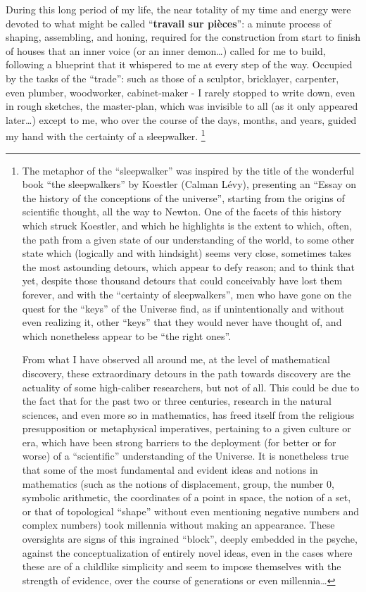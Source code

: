 During this long period of my life,
the near totality of my time and energy were devoted to what might be called 
``\textbf{travail sur pi\`eces}'': a minute process of  
shaping, assembling, and honing, required for the construction from start to finish of 
houses that an inner voice (or an inner demon\ldots) called for me to build, following a
blueprint that it whispered to me at every step of the way. Occupied by the tasks of the
``trade'': such as those of a sculptor, bricklayer, carpenter, even plumber, woodworker, 
cabinet-maker - I rarely stopped to write down, even in rough sketches, the master-plan,
which was invisible to all (as it only appeared later\ldots) except to me, who over the
course of the days, months, and years, guided my hand with the certainty of a sleepwalker.
\footnote{The metaphor of the ``sleepwalker'' was inspired by the title of the wonderful
book ``the sleepwalkers'' by Koestler (Calman L\'evy), presenting an ``Essay on the
history of the conceptions of the universe'', starting from the origins of scientific
thought, all the way to Newton. One of the facets of this history which struck Koestler,
and which he highlights is the extent to which, often, the path from a given 
state of our understanding of the world, to some other state which (logically and with
hindsight) seems very close, sometimes takes the most astounding detours, which appear to
defy reason; and to think that yet, despite those thousand detours that could conceivably
have lost them forever, and with the ``certainty of sleepwalkers'', men who have gone on
the quest for the ``keys'' of the Universe find, as if unintentionally and without even
realizing it, other ``keys'' that they would never have thought of, and which nonetheless
appear to be ``the right ones''. 

From what I have observed all around me, at the level of mathematical discovery, these
extraordinary detours in the path towards discovery are the actuality of some 
high-caliber researchers, but not of all. This could be due to the fact that 
for the past two or three centuries, research in the natural sciences, and even more so in 
mathematics, has freed itself from the religious presupposition 
or metaphysical imperatives, pertaining to a given culture or era, 
which have been strong barriers to the deployment (for better or for worse) of a
``scientific'' understanding of the Universe.
It is nonetheless true that some of the most fundamental and evident ideas and notions in
mathematics (such as the notions of displacement, group, the number $0$, symbolic
arithmetic, the coordinates of a point in space, the notion of a set, or that of
topological ``shape'' without even mentioning negative numbers and complex numbers) took
millennia without making an appearance. These oversights are 
signs of this ingrained ``block'', deeply embedded in the psyche, against the
conceptualization of entirely novel ideas, even in the cases where these are of a
childlike simplicity and seem to impose themselves with the strength of evidence, over the
course of generations or even millennia\ldots

}
